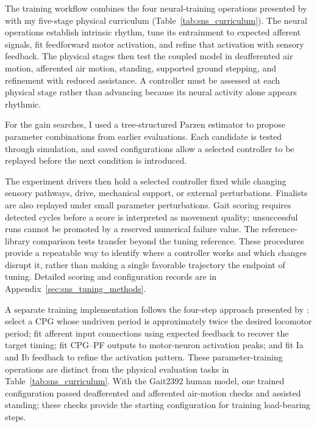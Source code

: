 The training workflow combines the four neural-training operations presented by \citet{hunt_inrc_2019} with my five-stage physical curriculum (Table~\ref{tab:sns_curriculum}). The neural operations establish intrinsic rhythm, tune its entrainment to expected afferent signals, fit feedforward motor activation, and refine that activation with sensory feedback. The physical stages then test the coupled model in deafferented air motion, afferented air motion, standing, supported ground stepping, and refinement with reduced assistance. A controller must be assessed at each physical stage rather than advancing because its neural activity alone appears rhythmic.

For the gain searches, I used a tree-structured Parzen estimator to propose parameter combinations from earlier evaluations. Each candidate is tested through simulation, and saved configurations allow a selected controller to be replayed before the next condition is introduced.

The experiment drivers then hold a selected controller fixed while changing sensory pathways, drive, mechanical support, or external perturbations. Finalists are also replayed under small parameter perturbations. Gait scoring requires detected cycles before a score is interpreted as movement quality; unsuccessful runs cannot be promoted by a reserved numerical failure value. The reference-library comparison tests transfer beyond the tuning reference. These procedures provide a repeatable way to identify where a controller works and which changes disrupt it, rather than making a single favorable trajectory the endpoint of tuning. Detailed scoring and configuration records are in Appendix~\ref{sec:sns_tuning_methods}.

A separate training implementation follows the four-step approach presented by \citet{hunt_inrc_2019}: select a CPG whose undriven period is approximately twice the desired locomotor period; fit afferent input connections using expected feedback to recover the target timing; fit CPG--PF outputs to motor-neuron activation peaks; and fit Ia and Ib feedback to refine the activation pattern. These parameter-training operations are distinct from the physical evaluation tasks in Table~\ref{tab:sns_curriculum}. With the Gait2392 human model, one trained configuration passed deafferented and afferented air-motion checks and assisted standing; these checks provide the starting configuration for training load-bearing steps.

